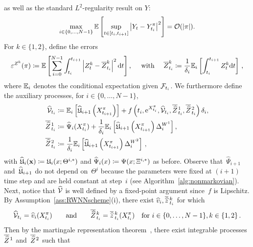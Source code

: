 as well as the standard $L^{2}$-regularity result on $Y$:
\begin{equation}\label{eq:L2regularity}
\max _{i\in\{0, \dots, N-1\}} \mathbb{E}\left[\sup _{t \in\left[t_{i}, t_{i+1}\right]}\left|Y_{t}-Y^\pi_{t_{i}}\right|^{2}\right] = \mathcal{O}(|\pi|).
\end{equation}
For $k\in\{1,2\}$, define the errors
\begin{equation}\label{eq:Z_error}
\varepsilon^{Z^k}(\pi) \coloneqq \mathbb{E}\left[\sum_{i=0}^{N-1} \int_{t_{i}}^{t_{i+1}}\left|Z^k_{t}-\overline{Z}^k_{t_{i}}\right|^{2} \mathrm{d} t\right], \quad \text { with } \quad \overline{Z}^k_{t_{i}} \coloneqq \frac{1}{\delta_{i}} \mathbb{E}_{i}\left[\int_{t_{i}}^{t_{i+1}} Z^k_{t} \mathrm{d} t\right]\,,
\end{equation}
where $\mathbb{E}_{i}$ denotes the conditional expectation given $\mathcal{F}_{t_{i}}$. 
We furthermore define the auxiliary processes, for $i\in\{0, \ldots, {N-1}\}$,
\begin{align}\label{eq:auxilaryProcesses}
\begin{split}
\widehat{\mathcal{V}}_{t_{i}} &\coloneqq \mathbb{E}_{i}\left[\widehat{\mathfrak{U}}_{i+1}\left(X^\pi_{t_{i+1}}\right)\right]+f\left(t_i, \mathrm{e}^{X^\pi_{t_{i}}}, \widehat{\mathcal{V}}_{t_{i}}, \overline{\widehat{Z}}\kern0.1em^{1}_{t_{i}}, \overline{\widehat{Z}}\kern0.1em^{2}_{t_{i}}\right) \delta_{i},  \\
\overline{\widehat{Z}}\kern0.1em^{1}_{t_{i}} &\coloneqq \widehat\Psi_i(X^\pi_{t_i}) + \frac{1}{\delta_{i}} \mathbb{E}_{i}\left[\widehat{\mathfrak{U}}_{i+1}\left(X^\pi_{t_{i+1}}\right) \Delta^{W^1}_{i}\right], \\
\overline{\widehat{Z}}\kern0.1em^{2}_{t_{i}} &\coloneqq \frac{1}{\delta_{i}} \mathbb{E}_{i}\left[\widehat{\mathfrak{U}}_{i+1}\left(X^\pi_{t_{i+1}}\right) \Delta^{W^2}_{i}\right]\,,
\end{split}
\end{align}
with $\widehat{\mathfrak{U}}_i(\boldsymbol{\mathrm{x}})\coloneqq\mathfrak{U}_i(x;\Theta^{i,*})$ and $ \widehat\Psi_i(x)\coloneqq\Psi(x;\Xi^{i,*})$ as before.
Observe that~$\widehat{\Psi}_{i+1}$
and~$\widehat{\mathfrak{U}}_{i+1}$ do not depend on~$\Theta^i$ 
because the parameters were fixed at $(i+1)$ time step and are held constant at step~$i$ 
(see Algorithm~\ref{alg:nonmarkovian}). Next, notice that $\widehat{\mathcal{V}}$ is well defined by a fixed-point argument
since~$f$ is Lipschitz. 
By Assumption~\ref{ass:RWNNscheme}(i), 
there exist $\widehat v_i, \overline{\widehat{z}}\,^{k}_{t_{i}}$ for which
\begin{equation}\label{eq:existenceAuxilary}
    \widehat{\mathcal{V}}_{t_i} = \widehat v_i(X^\pi_{t_i})\qquad \text{and} \qquad \overline{\widehat{Z}}\kern0.1em^{k}_{t_{i}} = \overline{\widehat{z}}\,^{k}_{t_{i}}(X^\pi_{t_i}) \quad \text{for } i\in\{0,\dots,N-1\}, k\in\{1,2\}\,.
\end{equation}
Then by the martingale representation theorem~\cite[Theorem  14.5.1]{Cohen2015StochasticApplications}, there exist integrable processes~$\overline{\widehat{Z}}\kern0.1em^{1}$ and~$\overline{\widehat{Z}}\kern0.1em^{2}$ such that
